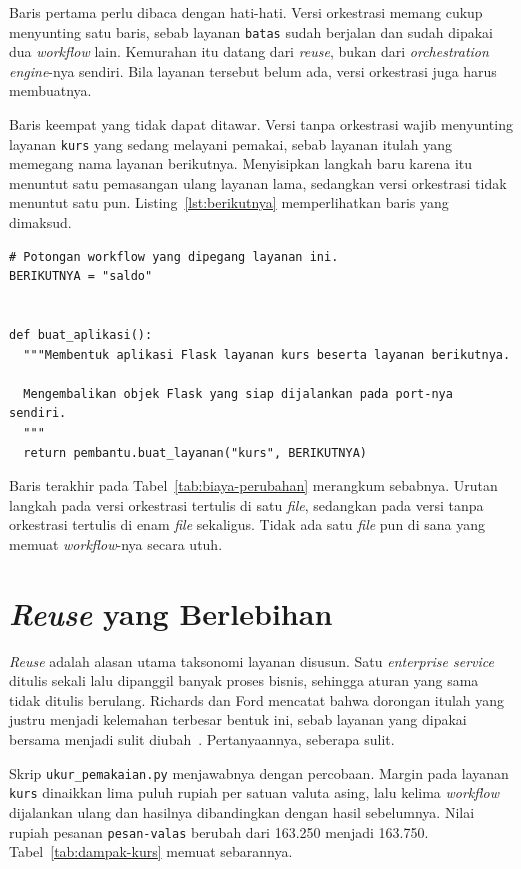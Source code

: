 Baris pertama perlu dibaca dengan hati-hati. Versi orkestrasi memang cukup
menyunting satu baris, sebab layanan \texttt{batas} sudah berjalan dan sudah
dipakai dua \textit{workflow} lain. Kemurahan itu datang dari \textit{reuse}, bukan
dari \textit{orchestration engine}-nya sendiri. Bila layanan tersebut belum ada, versi
orkestrasi juga harus membuatnya.

Baris keempat yang tidak dapat ditawar. Versi tanpa orkestrasi wajib menyunting
layanan \texttt{kurs} yang sedang melayani pemakai, sebab layanan itulah yang
memegang nama layanan berikutnya. Menyisipkan langkah baru karena itu menuntut
satu pemasangan ulang layanan lama, sedangkan versi orkestrasi tidak menuntut satu
pun. Listing~\ref{lst:berikutnya} memperlihatkan baris yang dimaksud.

\begin{lstlisting}[style=PythonStyle, caption={Potongan \textit{workflow} yang dipegang
  layanan kurs, tersedia di \berkas{sources/chapter12/berantai/kurs.py}},
  label=lst:berikutnya]
# Potongan workflow yang dipegang layanan ini.
BERIKUTNYA = "saldo"


def buat_aplikasi():
  """Membentuk aplikasi Flask layanan kurs beserta layanan berikutnya.

  Mengembalikan objek Flask yang siap dijalankan pada port-nya sendiri.
  """
  return pembantu.buat_layanan("kurs", BERIKUTNYA)
\end{lstlisting}

Baris terakhir pada Tabel~\ref{tab:biaya-perubahan} merangkum sebabnya. Urutan
langkah pada versi orkestrasi tertulis di satu \textit{file}, sedangkan pada versi
tanpa orkestrasi tertulis di enam \textit{file} sekaligus. Tidak ada satu \textit{file} pun
di sana yang memuat \textit{workflow}-nya secara utuh.

\section{\textit{Reuse} yang Berlebihan}

\textit{Reuse} adalah alasan utama taksonomi layanan disusun. Satu
\textit{enterprise service} ditulis sekali lalu dipanggil banyak proses bisnis, sehingga aturan
yang sama tidak ditulis berulang. Richards dan Ford mencatat bahwa dorongan
itulah yang justru menjadi kelemahan terbesar bentuk ini, sebab layanan yang
dipakai bersama menjadi sulit
diubah~\cite{richards2020fundamentals}. Pertanyaannya, seberapa sulit.

Skrip \texttt{ukur\_pemakaian.py} menjawabnya dengan percobaan. Margin pada
layanan \texttt{kurs} dinaikkan lima puluh rupiah per satuan valuta asing, lalu
kelima \textit{workflow} dijalankan ulang dan hasilnya dibandingkan dengan hasil
sebelumnya. Nilai rupiah pesanan \texttt{pesan-valas} berubah dari 163.250
menjadi 163.750. Tabel~\ref{tab:dampak-kurs} memuat sebarannya.

